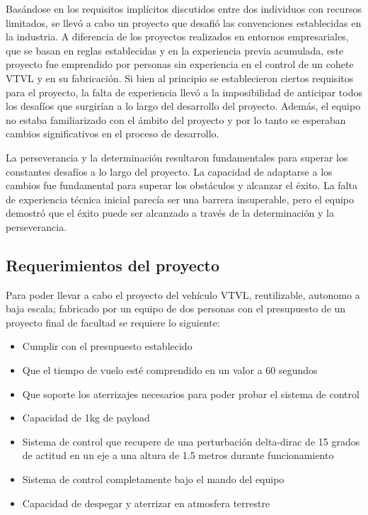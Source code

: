 Basándose en los requisitos implícitos discutidos entre dos individuos con recursos limitados, se llevó a cabo un proyecto que desafió las convenciones establecidas en la industria. A diferencia de los proyectos realizados en entornos empresariales, que se basan en reglas establecidas y en la experiencia previa acumulada, este proyecto fue emprendido por personas sin experiencia en el control de un cohete VTVL y en su fabricación. Si bien al principio se establecieron ciertos requisitos para el proyecto, la falta de experiencia llevó a la imposibilidad de anticipar todos los desafíos que surgirían a lo largo del desarrollo del proyecto. Además, el equipo no estaba familiarizado con el ámbito del proyecto y por lo tanto se esperaban cambios significativos en el proceso de desarrollo.

La perseverancia y la determinación resultaron fundamentales para superar los constantes desafíos a lo largo del proyecto. La capacidad de adaptarse a los cambios fue fundamental para superar los obstáculos y alcanzar el éxito. La falta de experiencia técnica inicial parecía ser una barrera insuperable, pero el equipo demostró que el éxito puede ser alcanzado a través de la determinación y la perseverancia.

\subsection*{Requerimientos del proyecto}
Para poder llevar a cabo el proyecto del vehículo VTVL, reutilizable, autonomo a baja escala; fabricado por un equipo de dos personas con el presupuesto de un proyecto final de facultad se requiere lo siguiente:
\begin{itemize}
    \item Cumplir con el presupuesto establecido
    \item Que el tiempo de vuelo esté comprendido en un valor a 60 segundos
    \item Que soporte los aterrizajes necesarios para poder probar el sistema de control
    \item Capacidad de 1kg de payload
    \item Sistema de control que recupere de una perturbación delta-dirac de 15 grados de actitud en un eje a una altura de 1.5 metros durante funcionamiento
    \item Sistema de control completamente bajo el mando del equipo
    \item Capacidad de despegar y aterrizar en atmosfera terrestre
\end{itemize}

